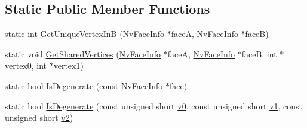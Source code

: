 \subsection*{Static Public Member Functions}
\begin{CompactItemize}
\item 
static int \hyperlink{class_nv_stripifier_5162c2dab0c5f466a7a4024bc8f3f937}{GetUniqueVertexInB} (\hyperlink{class_nv_face_info}{NvFaceInfo} $\ast$faceA, \hyperlink{class_nv_face_info}{NvFaceInfo} $\ast$faceB)
\item 
static void \hyperlink{class_nv_stripifier_ada5b25b94422d7d10d0b79fe7448081}{GetSharedVertices} (\hyperlink{class_nv_face_info}{NvFaceInfo} $\ast$faceA, \hyperlink{class_nv_face_info}{NvFaceInfo} $\ast$faceB, int $\ast$vertex0, int $\ast$vertex1)
\item 
static bool \hyperlink{class_nv_stripifier_3eb21915c9f371bfb591ed289e61b955}{IsDegenerate} (const \hyperlink{class_nv_face_info}{NvFaceInfo} $\ast$\hyperlink{glext_8h_676ca580c460c0154eb58200433d2a9e}{face})
\item 
static bool \hyperlink{class_nv_stripifier_7e10e9120d094e395cc4212bcc5ab51c}{IsDegenerate} (const unsigned short \hyperlink{glext__bak_8h_8f5597b6002609ead33af221dcf29790}{v0}, const unsigned short \hyperlink{glext__bak_8h_435c176a02c061b43e19bdf7c86cceae}{v1}, const unsigned short \hyperlink{glext__bak_8h_0928f6d0f0f794ba000a21dfae422136}{v2})
\end{CompactItemize}
